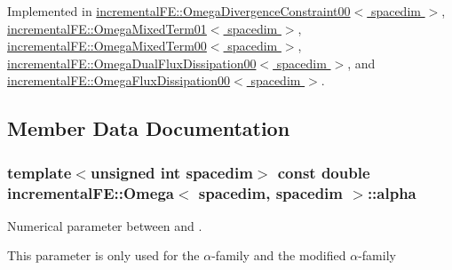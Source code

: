 Implemented in \hyperlink{classincremental_f_e_1_1_omega_divergence_constraint00_a56323a14c158f9008621a9a5d77f1be8}{incremental\+F\+E\+::\+Omega\+Divergence\+Constraint00$<$ spacedim $>$}, \hyperlink{classincremental_f_e_1_1_omega_mixed_term01_a6fe47df6c774ba07cb3455616997dfe7}{incremental\+F\+E\+::\+Omega\+Mixed\+Term01$<$ spacedim $>$}, \hyperlink{classincremental_f_e_1_1_omega_mixed_term00_abf975855eb0155318ad152e7fbac11d1}{incremental\+F\+E\+::\+Omega\+Mixed\+Term00$<$ spacedim $>$}, \hyperlink{classincremental_f_e_1_1_omega_dual_flux_dissipation00_a27833d3c88054ddf2231a32c6c6b2d2d}{incremental\+F\+E\+::\+Omega\+Dual\+Flux\+Dissipation00$<$ spacedim $>$}, and \hyperlink{classincremental_f_e_1_1_omega_flux_dissipation00_a7b9ccca9346b229a5e7f4f2254d932ec}{incremental\+F\+E\+::\+Omega\+Flux\+Dissipation00$<$ spacedim $>$}.



\subsection{Member Data Documentation}
\subsubsection[{\texorpdfstring{alpha}{alpha}}]{\setlength{\rightskip}{0pt plus 5cm}template$<$unsigned int spacedim$>$ const double {\bf incremental\+F\+E\+::\+Omega}$<$ spacedim, spacedim $>$\+::alpha\hspace{0.3cm}{\ttfamily [private]}}\hypertarget{classincremental_f_e_1_1_omega_3_01spacedim_00_01spacedim_01_4_ad881c36804cc027c301f4f069756c2db}{}\label{classincremental_f_e_1_1_omega_3_01spacedim_00_01spacedim_01_4_ad881c36804cc027c301f4f069756c2db}
Numerical parameter between {} and {}.

This parameter is only used for the $\alpha$-\/family and the modified $\alpha$-\/family 
